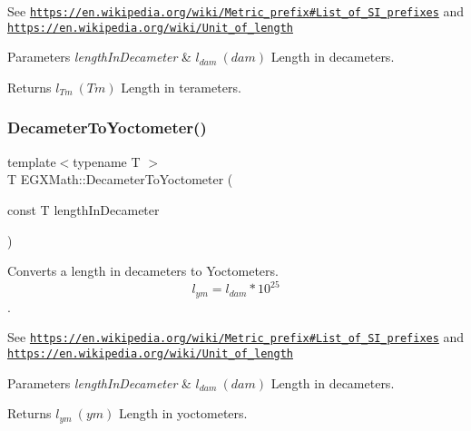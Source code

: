See \href{https://en.wikipedia.org/wiki/Metric_prefix#List_of_SI_prefixes}{\tt https\+://en.\+wikipedia.\+org/wiki/\+Metric\+\_\+prefix\#\+List\+\_\+of\+\_\+\+S\+I\+\_\+prefixes} and \href{https://en.wikipedia.org/wiki/Unit_of_length}{\tt https\+://en.\+wikipedia.\+org/wiki/\+Unit\+\_\+of\+\_\+length} 
\begin{DoxyParams}{Parameters}
{\em length\+In\+Decameter} & $ l_{dam}\ (dam)$ Length in decameters. \\
\hline
\end{DoxyParams}
\begin{DoxyReturn}{Returns}
$ l_{Tm}\ (Tm)$ Length in terameters. 
\end{DoxyReturn}
\mbox{\label{group___e_g_x_math-_conversions-_length_conversions-_decameter-_s_i_ga1e90c34b56ee230eec4a3e00a3fedbde}} 
\subsubsection{\texorpdfstring{Decameter\+To\+Yoctometer()}{DecameterToYoctometer()}}
{\footnotesize\ttfamily template$<$typename T $>$ \\
T E\+G\+X\+Math\+::\+Decameter\+To\+Yoctometer (\begin{DoxyParamCaption}\item[{const T}]{length\+In\+Decameter }\end{DoxyParamCaption})}



Converts a length in decameters to Yoctometers. \[ l_{ym}=l_{dam} * 10^{25} \]. 

See \href{https://en.wikipedia.org/wiki/Metric_prefix#List_of_SI_prefixes}{\tt https\+://en.\+wikipedia.\+org/wiki/\+Metric\+\_\+prefix\#\+List\+\_\+of\+\_\+\+S\+I\+\_\+prefixes} and \href{https://en.wikipedia.org/wiki/Unit_of_length}{\tt https\+://en.\+wikipedia.\+org/wiki/\+Unit\+\_\+of\+\_\+length} 
\begin{DoxyParams}{Parameters}
{\em length\+In\+Decameter} & $ l_{dam}\ (dam)$ Length in decameters. \\
\hline
\end{DoxyParams}
\begin{DoxyReturn}{Returns}
$ l_{ym}\ (ym)$ Length in yoctometers. 
\end{DoxyReturn}
\mbox{\label{group___e_g_x_math-_conversions-_length_conversions-_decameter-_s_i_gaa10c7c9c4e75fc2d647d4f85ff8d801b}} 
